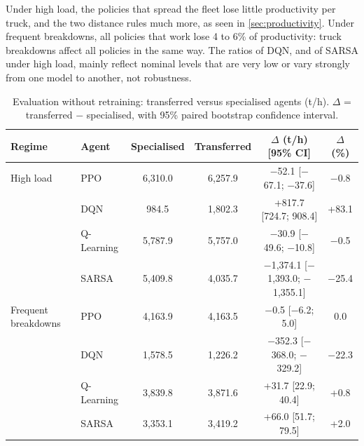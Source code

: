 \documentclass[11pt,a4paper]{article}
\newif\ifrevmarks
\newcommand{\revtag}[1]{\ifrevmarks\textsuperscript{\textcolor{red!70!black}{\scriptsize[#1]}}\fi}
\newenvironment{revbloc}[1]{\par\ifrevmarks\color{revcolor}\noindent\revtag{#1}\ \fi}{\par}
\newif\ifcorrmarks
\newcommand{\corr}[1]{\ifcorrmarks\textcolor{corrcolor}{#1}\else#1\fi}
\begin{document}
\begin{revbloc}{T31}
\corr{Under high load, the policies that spread the fleet lose little productivity per truck, and the two distance rules much more, as seen in \cref{sec:productivity}. Under frequent breakdowns, all policies that work lose 4 to 6\% of productivity: truck breakdowns affect all policies in the same way. The ratios of DQN, and of SARSA under high load, mainly reflect} nominal levels that are very low or vary strongly from one model to another, not robustness.
\end{revbloc}

\begin{revbloc}{T31}
\begin{table}[H]
\centering
\caption{Evaluation without retraining: transferred versus specialised agents (t/h). $\Delta$ = transferred $-$ specialised, with 95\% paired bootstrap confidence interval.}
\label{tab:transfer}
\small
\setlength{\tabcolsep}{4pt}
\begin{tabular}{llcccc}
\toprule
\textbf{Regime} & \textbf{Agent} & \textbf{Specialised} & \textbf{Transferred} & \textbf{$\Delta$ (t/h) [95\% CI]} & \textbf{$\Delta$ (\%)} \\
\midrule
High load           & PPO        & 6,310.0 & 6,257.9 & $-$52.1 [$-$67.1; $-$37.6] & $-$0.8 \\
                    & DQN        & 984.5   & 1,802.3 & +817.7 [724.7; 908.4] & +83.1 \\
                    & Q-Learning & 5,787.9 & 5,757.0 & $-$30.9 [$-$49.6; $-$10.8] & $-$0.5 \\
                    & SARSA      & 5,409.8 & 4,035.7 & $-$1,374.1 [$-$1,393.0; $-$1,355.1] & $-$25.4 \\
\midrule
Frequent breakdowns & PPO        & 4,163.9 & 4,163.5 & $-$0.5 [$-$6.2; 5.0] & 0.0 \\
                    & DQN        & 1,578.5 & 1,226.2 & $-$352.3 [$-$368.0; $-$329.2] & $-$22.3 \\
                    & Q-Learning & 3,839.8 & 3,871.6 & +31.7 [22.9; 40.4] & +0.8 \\
                    & SARSA      & 3,353.1 & 3,419.2 & +66.0 [51.7; 79.5] & +2.0 \\
\bottomrule
\end{tabular}
\end{table}


\end{revbloc}
\end{document}
